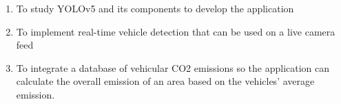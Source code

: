 \begin{comment}
How to formulate your research objectives:
1. Identify what research steps do you need to perform to achieve your general objective.
2. Identify the questions that must be answered for you to achieve your general objective.
    Thereafter, convert these questions into action statements

Example #1:

Research Question:
  What are the general features of a web-based learning environment?

Specific Objective:
   To review existing web-based learning environment that teaches language learning for children


Example #2:

Research Question:
   How will you represent commonsense knowledge for use by computer systems?

Specific Objective:
   To identify knowledge representation approaches used by existing story generation systems

Example #3:
Research Question:
   What types of storytelling knowledge are needed to generate stories?

Specific Objective:
    To identify the different types of storytelling knowledge used in generating stories

Example #4:
Research Question:
    What machine learning approaches will you utilize?

Specific Objective:
    To determine existing machine learning algorithms [that can be used in training the computer system to detect cyberbullying cases] 

Example #5: Research Question:
    How will your research output be evaluated?

Specific Objective:
    To define evaluation metrics for validating the accuracy of the translation

\end{comment}

%
%

\begin{enumerate}
   
   \item To study YOLOv5 and its components to develop the application
   \item To implement real-time vehicle detection that can be used on a live camera feed
   \item To integrate a database of vehicular CO2 emissions so the application can calculate the overall emission of an area based on the vehicles' average emission.

\end{enumerate}


